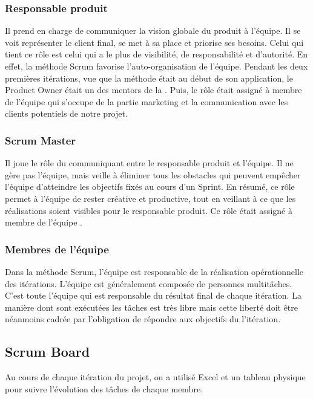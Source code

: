 \subsubsection{Responsable produit }

Il prend en charge de communiquer la vision globale du produit à l'équipe. Il
se voit représenter le client final, se met à sa place et priorise ses besoins.
Celui qui tient ce rôle est celui qui a le plus de visibilité, de
responsabilité et d'autorité. En effet, la méthode Scrum favorise
l'auto-organisation de l'équipe. Pendant les deux premières itérations, vue que
la méthode était au début de son application, le Product Owner était un des
mentors de la . Puis, le rôle était assigné à membre
de l'équipe qui s'occupe de la partie marketing et la communication avec les
clients potentiels de notre projet.

\subsubsection{Scrum Master}

Il joue le rôle du communiquant entre le responsable produit et l'équipe. Il ne
gère pas l'équipe, mais veille à éliminer tous les obstacles qui peuvent
empêcher l'équipe d'atteindre les objectifs fixés au cours d'un Sprint. En
résumé, ce rôle permet à l'équipe de rester créative et productive, tout en
veillant à ce que les réalisations soient visibles pour le responsable produit.
Ce rôle était assigné à membre de l'équipe .

\subsubsection{Membres de l'équipe}

Dans la méthode Scrum, l'équipe est responsable de la réalisation
opérationnelle des itérations. L'équipe est généralement composée de personnes
multitâches. C'est toute l'équipe qui est responsable du résultat final de
chaque itération. La manière dont sont exécutées les tâches est très libre mais
cette liberté doit être néanmoins cadrée par l'obligation de répondre aux
objectifs du l'itération.

\subsection{Scrum Board}

Au cours de chaque itération du projet, on a utilisé Excel et un tableau
physique pour suivre l'évolution des tâches de chaque membre.

